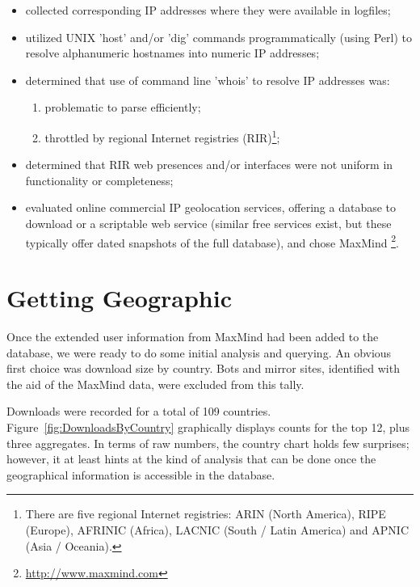 \begin{itemize}

\item collected corresponding IP addresses where they were available in logfiles;

\item utilized UNIX 'host' and/or 'dig' commands programmatically (using Perl) to resolve alphanumeric hostnames into numeric IP addresses;

\item determined that use of command line 'whois' to resolve IP addresses was:

\begin{enumerate}

\item problematic to parse efficiently;

\item throttled by regional Internet registries (RIR)\footnote{There are five regional Internet registries: ARIN (North America), RIPE (Europe), 
AFRINIC (Africa), LACNIC (South / Latin America) and APNIC (Asia / 
Oceania).};

\end{enumerate}

\item determined that RIR web presences and/or interfaces were not uniform in functionality or completeness;

\item evaluated online commercial IP geo\-location services, offering a database to download or a scriptable web service (similar free services exist, but these typically offer dated snapshots of the full database), and chose MaxMind \footnote{\url{http://www.maxmind.com}}.

\end{itemize}

\section{Getting Geographic}

Once the extended user information from MaxMind had been added to the database, we were ready to do some initial analysis and querying. An obvious first choice was download size by country. Bots and mirror sites, identified with the aid of the MaxMind data, were excluded from this tally.

Downloads were recorded for a total of 109 countries. Figure~\ref{fig:DownloadsByCountry} graphically displays counts for the top 12, plus three aggregates. In terms of raw numbers, the country chart holds few surprises; however, it at least hints at the kind of analysis that can be done once the geographical information is accessible in the database.

